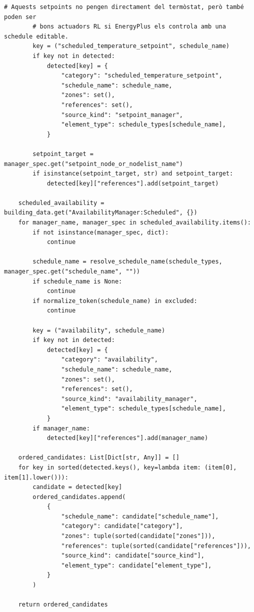 \documentclass[10pt,a4paper]{article}
\begin{document}
\begin{lstlisting}[style=studioPython,caption={backend/afegir\_entorn\_analysis.py},label={lst:backend-afegir-entorn-analysis-py}]
        # Aquests setpoints no pengen directament del termòstat, però també poden ser
        # bons actuadors RL si EnergyPlus els controla amb una schedule editable.
        key = ("scheduled_temperature_setpoint", schedule_name)
        if key not in detected:
            detected[key] = {
                "category": "scheduled_temperature_setpoint",
                "schedule_name": schedule_name,
                "zones": set(),
                "references": set(),
                "source_kind": "setpoint_manager",
                "element_type": schedule_types[schedule_name],
            }

        setpoint_target = manager_spec.get("setpoint_node_or_nodelist_name")
        if isinstance(setpoint_target, str) and setpoint_target:
            detected[key]["references"].add(setpoint_target)

    scheduled_availability = building_data.get("AvailabilityManager:Scheduled", {})
    for manager_name, manager_spec in scheduled_availability.items():
        if not isinstance(manager_spec, dict):
            continue

        schedule_name = resolve_schedule_name(schedule_types, manager_spec.get("schedule_name", ""))
        if schedule_name is None:
            continue
        if normalize_token(schedule_name) in excluded:
            continue

        key = ("availability", schedule_name)
        if key not in detected:
            detected[key] = {
                "category": "availability",
                "schedule_name": schedule_name,
                "zones": set(),
                "references": set(),
                "source_kind": "availability_manager",
                "element_type": schedule_types[schedule_name],
            }
        if manager_name:
            detected[key]["references"].add(manager_name)

    ordered_candidates: List[Dict[str, Any]] = []
    for key in sorted(detected.keys(), key=lambda item: (item[0], item[1].lower())):
        candidate = detected[key]
        ordered_candidates.append(
            {
                "schedule_name": candidate["schedule_name"],
                "category": candidate["category"],
                "zones": tuple(sorted(candidate["zones"])),
                "references": tuple(sorted(candidate["references"])),
                "source_kind": candidate["source_kind"],
                "element_type": candidate["element_type"],
            }
        )

    return ordered_candidates



\end{lstlisting}
\end{document}
